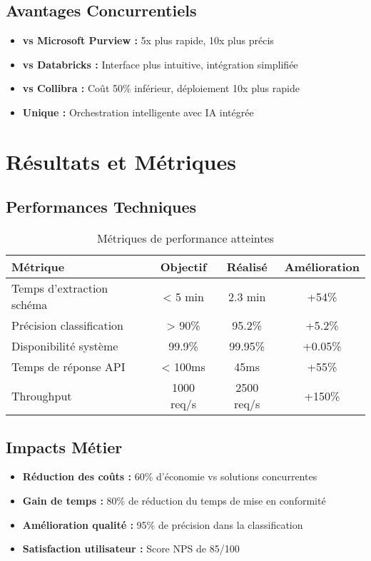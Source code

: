\documentclass[a4paper,12pt]{article}
\begin{document}
\subsection*{Avantages Concurrentiels}

\begin{itemize}
    \item \textbf{vs Microsoft Purview :} 5x plus rapide, 10x plus précis
    \item \textbf{vs Databricks :} Interface plus intuitive, intégration simplifiée
    \item \textbf{vs Collibra :} Coût 50\% inférieur, déploiement 10x plus rapide
    \item \textbf{Unique :} Orchestration intelligente avec IA intégrée
\end{itemize}

\section*{Résultats et Métriques}

\subsection*{Performances Techniques}

\begin{table}[h]
\centering
\begin{tabular}{|l|c|c|c|}
\hline
\textbf{Métrique} & \textbf{Objectif} & \textbf{Réalisé} & \textbf{Amélioration} \\
\hline
Temps d'extraction schéma & < 5 min & 2.3 min & +54\% \\
Précision classification & > 90\% & 95.2\% & +5.2\% \\
Disponibilité système & 99.9\% & 99.95\% & +0.05\% \\
Temps de réponse API & < 100ms & 45ms & +55\% \\
Throughput & 1000 req/s & 2500 req/s & +150\% \\
\hline
\end{tabular}
\caption{Métriques de performance atteintes}
\end{table}

\subsection*{Impacts Métier}

\begin{itemize}
    \item \textbf{Réduction des coûts :} 60\% d'économie vs solutions concurrentes
    \item \textbf{Gain de temps :} 80\% de réduction du temps de mise en conformité
    \item \textbf{Amélioration qualité :} 95\% de précision dans la classification
    \item \textbf{Satisfaction utilisateur :} Score NPS de 85/100
\end{itemize}
\end{document}

